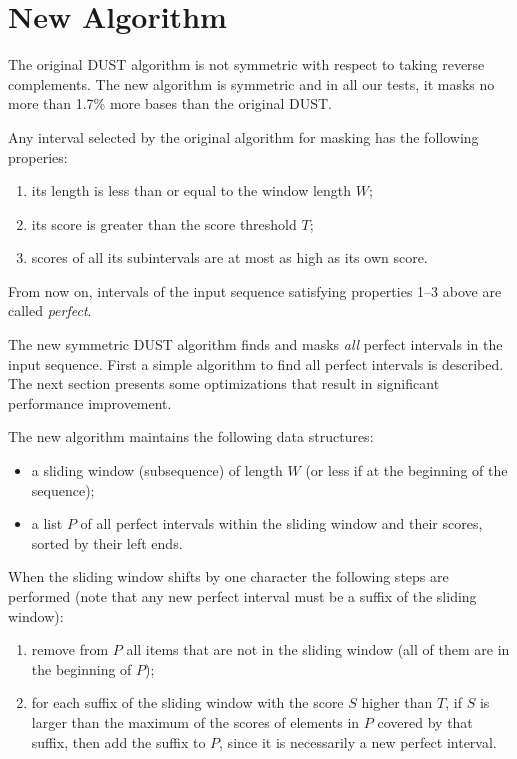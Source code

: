 \documentclass{article}
\begin{document}
\section{New Algorithm}

The original DUST algorithm is not symmetric with respect to taking reverse
complements. The new algorithm is symmetric and in all our tests, it masks 
no more than 1.7\% more bases than the original DUST.

Any interval selected by the original algorithm for masking has 
the following properies:

\begin{enumerate}
\item its length is less than or equal to the window length $W$;
\item its score is greater than the score threshold $T$;
\item scores of all its subintervals are at most as high as its own score.
\end{enumerate}

From now on, intervals of the input sequence satisfying properties 1--3 above
are called {\em perfect}.

The new symmetric DUST algorithm finds and masks {\em all} perfect intervals in the input 
sequence. First a simple algorithm to find all perfect intervals is described.
The next section presents some optimizations that result in significant 
performance improvement.

The new algorithm maintains the following data structures:

\begin{itemize}
\item a sliding window (subsequence) of length $W$ (or less if at the 
      beginning of the sequence);
\item a list $P$ of all perfect intervals within the sliding window and 
      their scores, sorted by their left ends.
\end{itemize}

When the sliding window shifts by one character the following steps are 
performed (note that any new perfect interval must be a suffix of the 
sliding window):

\begin{enumerate}
\item remove from $P$ all items that are not in the sliding window (all of them
      are in the beginning of $P$);
\item for each suffix of the sliding window with the score $S$ higher than $T$,
      if $S$ is larger than the maximum of the scores of elements in $P$ covered 
      by that suffix, then add the suffix to $P$, since it is necessarily a 
      new perfect interval.
\end{enumerate}
\end{document}
